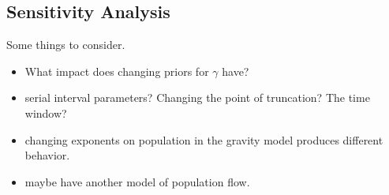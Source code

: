 \documentclass[a4paper,12pt]{article}
\begin{document}
\subsection*{Sensitivity Analysis}
Some things to consider.
\begin{itemize}
\item What impact does changing priors for $\gamma$ have?
\item serial interval parameters?
  Changing the point of truncation? The time window?
\item changing exponents on population in the gravity model produces
  different behavior.
 \item maybe have another model of population flow.  
\end{itemize}


\end{document}
